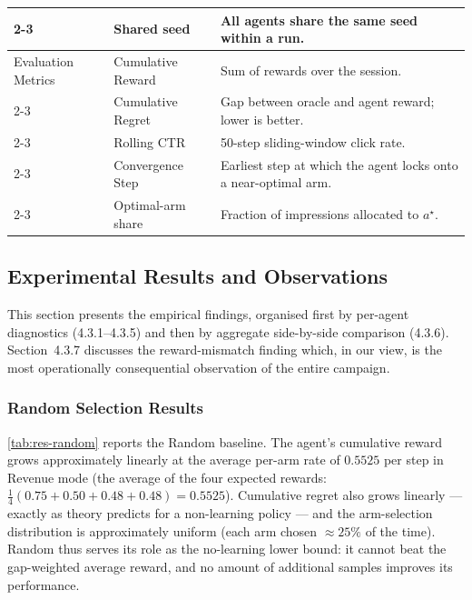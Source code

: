 \begin{table}[H]
\begin{tabularx}{\linewidth}{|p{3.4cm}|p{4.0cm}|X|}
\cline{2-3}
                     & Shared seed       & All agents share the same seed within a run.\\
\hline
Evaluation Metrics   & Cumulative Reward & Sum of rewards over the session.\\
\cline{2-3}
                     & Cumulative Regret & Gap between oracle and agent reward; lower is better.\\
\cline{2-3}
                     & Rolling CTR       & 50-step sliding-window click rate.\\
\cline{2-3}
                     & Convergence Step  & Earliest step at which the agent locks onto a near-optimal arm.\\
\cline{2-3}
                     & Optimal-arm share & Fraction of impressions allocated to $a^\star$.\\
\hline
\end{tabularx}
\end{table}

\subsection{Experimental Results and Observations}
This section presents the empirical findings, organised first by per-agent diagnostics (4.3.1--4.3.5) and then by aggregate side-by-side comparison (4.3.6). Section~4.3.7 discusses the reward-mismatch finding which, in our view, is the most operationally consequential observation of the entire campaign.

\subsubsection{Random Selection Results}
\cref{tab:res-random} reports the Random baseline. The agent's cumulative reward grows approximately linearly at the average per-arm rate of $0.5525$ per step in Revenue mode (the average of the four expected rewards: $\tfrac{1}{4}(0.75 + 0.50 + 0.48 + 0.48) = 0.5525$). Cumulative regret also grows linearly --- exactly as theory predicts for a non-learning policy --- and the arm-selection distribution is approximately uniform (each arm chosen $\approx 25\%$ of the time). Random thus serves its role as the no-learning lower bound: it cannot beat the gap-weighted average reward, and no amount of additional samples improves its performance.

